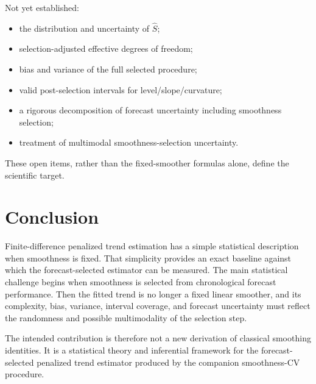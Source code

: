 \documentclass[11pt]{article}
\begin{document}
Not yet established:
\begin{itemize}
\item the distribution and uncertainty of \(\widehat S\);
\item selection-adjusted effective degrees of freedom;
\item bias and variance of the full selected procedure;
\item valid post-selection intervals for level/slope/curvature;
\item a rigorous decomposition of forecast uncertainty including smoothness
selection;
\item treatment of multimodal smoothness-selection uncertainty.
\end{itemize}

These open items, rather than the fixed-smoother formulas alone, define the
scientific target.

\section{Conclusion}

Finite-difference penalized trend estimation has a simple statistical
description when smoothness is fixed. That simplicity provides an exact
baseline against which the forecast-selected estimator can be measured. The
main statistical challenge begins when smoothness is selected from
chronological forecast performance. Then the fitted trend is no longer a fixed
linear smoother, and its complexity, bias, variance, interval coverage, and
forecast uncertainty must reflect the randomness and possible multimodality of
the selection step.

The intended contribution is therefore not a new derivation of classical
smoothing identities. It is a statistical theory and inferential framework for
the forecast-selected penalized trend estimator produced by the companion
smoothness-CV procedure.
\end{document}
